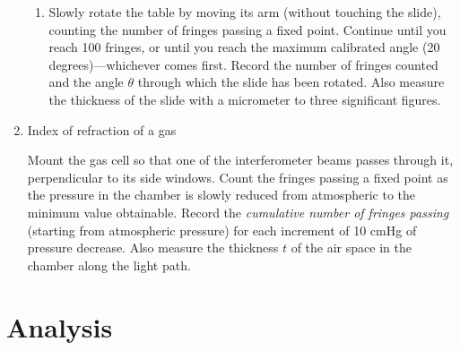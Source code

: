 \begin{enumerate}
\begin{enumerate}
\item Slowly rotate the table by moving its arm (without touching 
the slide), counting the number of fringes passing a fixed point. Continue until you 
reach 100 fringes, or until you reach the maximum calibrated 
angle (20 degrees)---whichever comes first. Record the number 
of fringes counted and the angle $\theta$ through which the 
slide has been rotated. Also measure the thickness of the slide with a
micrometer to three significant figures.
\end{enumerate}

\item Index of refraction of a gas 

Mount the gas cell so that one of the interferometer beams passes 
through it, perpendicular to its side windows. Count the fringes 
passing a fixed point as the pressure in the chamber is slowly 
reduced from atmospheric to the minimum value obtainable. Record 
the {\em cumulative number of fringes passing} (starting from 
atmospheric pressure) for each increment of 10 cmHg of pressure 
decrease. Also measure the thickness $t$ of
the air space in the chamber along the light path. 

\end{enumerate}

\section{Analysis}

